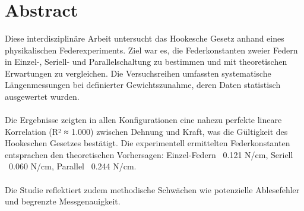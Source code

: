 \documentclass[../main.tex]{subfiles} %
\begin{document}
\\
\\
\\
    \section{Abstract}\label{sec:abstract}
        Diese interdisziplinäre Arbeit untersucht das Hookesche Gesetz anhand eines physikalischen Federexperiments.
        Ziel war es, die Federkonstanten zweier Federn in Einzel-, Seriell- und Parallelschaltung zu bestimmen und mit theoretischen Erwartungen zu vergleichen.
        Die Versuchsreihen umfassten systematische Längenmessungen bei definierter Gewichtszunahme, deren Daten statistisch ausgewertet wurden.
        \\
        \\
        Die Ergebnisse zeigten in allen Konfigurationen eine nahezu perfekte lineare Korrelation (R² ≈ 1.000) zwischen Dehnung und Kraft, was die Gültigkeit des Hookeschen Gesetzes bestätigt.
        Die experimentell ermittelten Federkonstanten entsprachen den theoretischen Vorhersagen: Einzel-Federn ~0.121 N/cm, Seriell ~0.060 N/cm, Parallel ~0.244 N/cm.
        \\
        \\
        Die Studie reflektiert zudem methodische Schwächen wie potenzielle Ablesefehler und begrenzte Messgenauigkeit.
\end{document}
